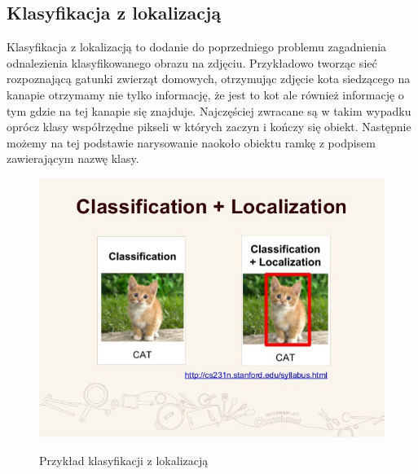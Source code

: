 \documentclass{article}
\begin{document}
\subsection{Klasyfikacja z lokalizacją}
Klasyfikacja z lokalizacją to dodanie do poprzedniego problemu zagadnienia odnalezienia klasyfikowanego obrazu na zdjęciu.
Przykładowo tworząc sieć rozpoznającą gatunki zwierząt domowych, otrzymując zdjęcie kota siedzącego na kanapie otrzymamy nie tylko informację,
że jest to kot ale również informację o tym gdzie na tej kanapie się znajduje.
Najczęściej zwracane są w takim wypadku oprócz klasy współrzędne pikseli w których zaczyn i kończy się obiekt.
Następnie możemy na tej podstawie narysowanie naokoło obiektu ramkę z podpisem zawierającym nazwę klasy.
\begin{figure}[H]
    \centering
    \includegraphics[width=\linewidth]{images/klasyfikacja_z_lokalizacja.jpeg}
    \caption{Przykład klasyfikacji z lokalizacją}
    \cite{unet}
    \label{fig:klasyfikacja_z_lokalizacja}
\end{figure}
\end{document}
